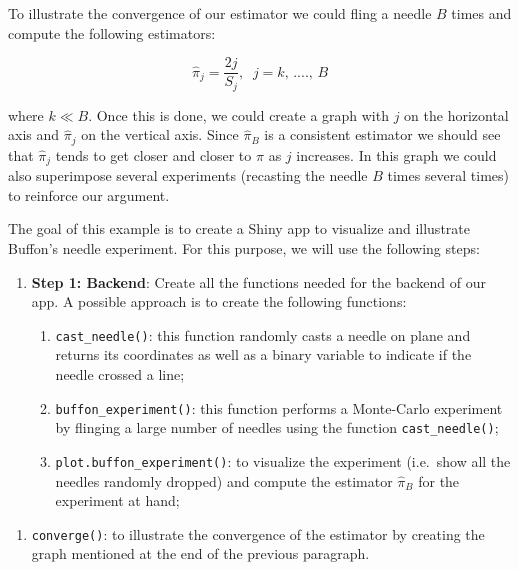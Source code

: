 \documentclass[12pt,]{krantz}
\providecommand{\tightlist}{%
  \setlength{\itemsep}{0pt}\setlength{\parskip}{0pt}}
\begin{document}
To illustrate the convergence of our estimator we could fling a needle
\(B\) times and compute the following estimators:

\[
\hat{\pi}_j = \frac{2j}{S_j}, \;\; j = k,\, ...., \,B
\]

where \(k \ll B\). Once this is done, we could create a graph with \(j\)
on the horizontal axis and \(\hat{\pi}_j\) on the vertical axis. Since
\(\hat{\pi}_B\) is a consistent estimator we should see that
\(\hat{\pi}_j\) tends to get closer and closer to \(\pi\) as \(j\)
increases. In this graph we could also superimpose several experiments
(recasting the needle \(B\) times several times) to reinforce our
argument.

The goal of this example is to create a Shiny app to visualize and
illustrate Buffon's needle experiment. For this purpose, we will use the
following steps:

\begin{enumerate}
\def\labelenumi{\arabic{enumi})}
\tightlist
\item
  \textbf{Step 1: Backend}: Create all the functions needed for the
  backend of our app. A possible approach is to create the following
  functions:

  \begin{enumerate}
  \def\labelenumii{\alph{enumii})}
  \tightlist
  \item
    \texttt{cast\_needle()}: this function randomly casts a needle on
    plane and returns its coordinates as well as a binary variable to
    indicate if the needle crossed a line;
  \item
    \texttt{buffon\_experiment()}: this function performs a Monte-Carlo
    experiment by flinging a large number of needles using the function
    \texttt{cast\_needle()};
  \item
    \texttt{plot.buffon\_experiment()}: to visualize the experiment
    (i.e.~show all the needles randomly dropped) and compute the
    estimator \(\hat{\pi}_B\) for the experiment at hand;
  \end{enumerate}
\end{enumerate}

\begin{enumerate}
\def\labelenumi{\alph{enumi})}
\setcounter{enumi}{3}
\tightlist
\item
  \texttt{converge()}: to illustrate the convergence of the estimator by
  creating the graph mentioned at the end of the previous paragraph.
\end{enumerate}
\end{document}
